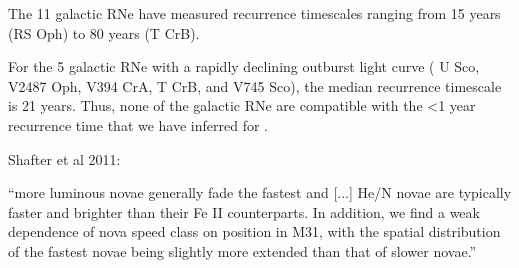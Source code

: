 The 11 galactic RNe have measured recurrence timescales ranging from 15 years (RS Oph) to 80 years (T CrB). 

For the 5 galactic RNe with a rapidly declining outburst light curve (
U Sco, V2487 Oph, V394 CrA, T CrB, and V745 Sco), the median
recurrence timescale is 21 years.  Thus, none of the galactic RNe are
compatible with the <1 year recurrence time that we have inferred for
\spock.  


Shafter et al 2011:

``more luminous novae generally fade the fastest and [...]  He/N novae
are typically faster and brighter than their Fe II counterparts. In
addition, we find a weak dependence of nova speed class on position in
M31, with the spatial distribution of the fastest novae being slightly
more extended than that of slower novae.''




